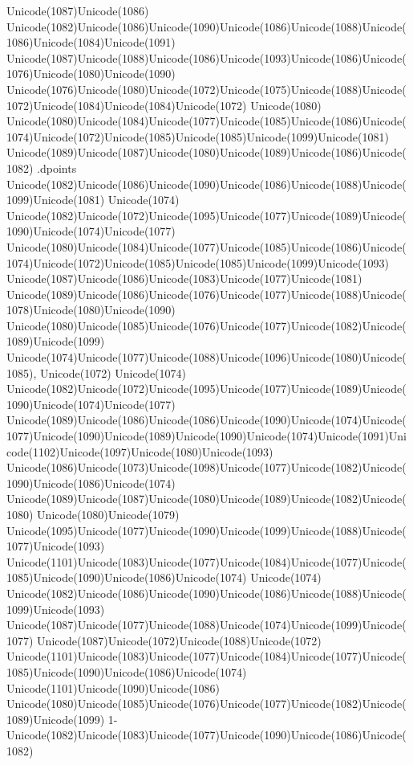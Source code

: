 \documentclass[a4paper,11pt]{report}
\begin{document}
{{Unicode(1087)Unicode(1086)
Unicode(1082)Unicode(1086)Unicode(1090)Unicode(1086)Unicode(1088)Unicode(1086)Unicode(1084)Unicode(1091)
Unicode(1087)Unicode(1088)Unicode(1086)Unicode(1093)Unicode(1086)Unicode(1076)Unicode(1080)Unicode(1090)
Unicode(1076)Unicode(1080)Unicode(1072)Unicode(1075)Unicode(1088)Unicode(1072)Unicode(1084)Unicode(1084)Unicode(1072)
Unicode(1080)
Unicode(1080)Unicode(1084)Unicode(1077)Unicode(1085)Unicode(1086)Unicode(1074)Unicode(1072)Unicode(1085)Unicode(1085)Unicode(1099)Unicode(1081)
Unicode(1089)Unicode(1087)Unicode(1080)Unicode(1089)Unicode(1086)Unicode(1082)
.dpoints
Unicode(1082)Unicode(1086)Unicode(1090)Unicode(1086)Unicode(1088)Unicode(1099)Unicode(1081)
Unicode(1074)
Unicode(1082)Unicode(1072)Unicode(1095)Unicode(1077)Unicode(1089)Unicode(1090)Unicode(1074)Unicode(1077)
Unicode(1080)Unicode(1084)Unicode(1077)Unicode(1085)Unicode(1086)Unicode(1074)Unicode(1072)Unicode(1085)Unicode(1085)Unicode(1099)Unicode(1093)
Unicode(1087)Unicode(1086)Unicode(1083)Unicode(1077)Unicode(1081)
Unicode(1089)Unicode(1086)Unicode(1076)Unicode(1077)Unicode(1088)Unicode(1078)Unicode(1080)Unicode(1090)
Unicode(1080)Unicode(1085)Unicode(1076)Unicode(1077)Unicode(1082)Unicode(1089)Unicode(1099)
Unicode(1074)Unicode(1077)Unicode(1088)Unicode(1096)Unicode(1080)Unicode(1085),
Unicode(1072) Unicode(1074)
Unicode(1082)Unicode(1072)Unicode(1095)Unicode(1077)Unicode(1089)Unicode(1090)Unicode(1074)Unicode(1077)
Unicode(1089)Unicode(1086)Unicode(1086)Unicode(1090)Unicode(1074)Unicode(1077)Unicode(1090)Unicode(1089)Unicode(1090)Unicode(1074)Unicode(1091)Unicode(1102)Unicode(1097)Unicode(1080)Unicode(1093)
Unicode(1086)Unicode(1073)Unicode(1098)Unicode(1077)Unicode(1082)Unicode(1090)Unicode(1086)Unicode(1074)
Unicode(1089)Unicode(1087)Unicode(1080)Unicode(1089)Unicode(1082)Unicode(1080)
Unicode(1080)Unicode(1079)
Unicode(1095)Unicode(1077)Unicode(1090)Unicode(1099)Unicode(1088)Unicode(1077)Unicode(1093)
Unicode(1101)Unicode(1083)Unicode(1077)Unicode(1084)Unicode(1077)Unicode(1085)Unicode(1090)Unicode(1086)Unicode(1074)
Unicode(1074)
Unicode(1082)Unicode(1086)Unicode(1090)Unicode(1086)Unicode(1088)Unicode(1099)Unicode(1093)
Unicode(1087)Unicode(1077)Unicode(1088)Unicode(1074)Unicode(1099)Unicode(1077)
Unicode(1087)Unicode(1072)Unicode(1088)Unicode(1072)
Unicode(1101)Unicode(1083)Unicode(1077)Unicode(1084)Unicode(1077)Unicode(1085)Unicode(1090)Unicode(1086)Unicode(1074)
Unicode(1101)Unicode(1090)Unicode(1086)
Unicode(1080)Unicode(1085)Unicode(1076)Unicode(1077)Unicode(1082)Unicode(1089)Unicode(1099)
1-Unicode(1082)Unicode(1083)Unicode(1077)Unicode(1090)Unicode(1086)Unicode(1082)
}}
\end{document}
